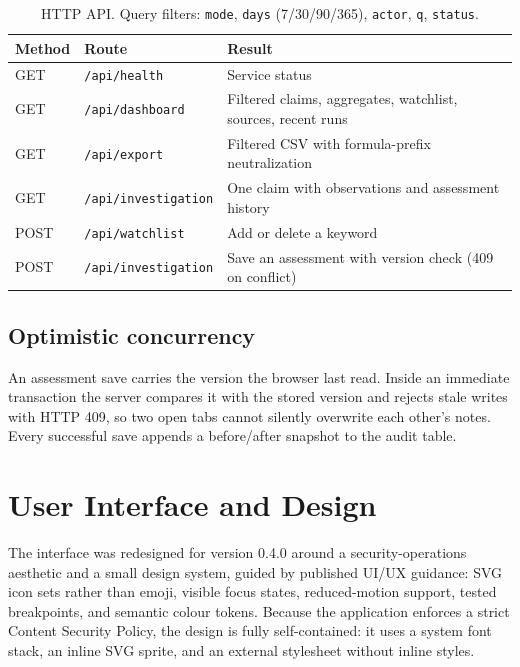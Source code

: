 \documentclass[11pt,a4paper]{article}
\newcommand{\code}[1]{\texttt{\small #1}}
\begin{document}
\begin{table}[H]
\centering
\renewcommand{\arraystretch}{1.2}
\begin{tabularx}{\linewidth}{@{}l l X@{}}
\toprule
\textbf{Method} & \textbf{Route} & \textbf{Result} \\
\midrule
GET & \code{/api/health} & Service status \\
GET & \code{/api/dashboard} & Filtered claims, aggregates, watchlist, sources, recent runs \\
GET & \code{/api/export} & Filtered CSV with formula-prefix neutralization \\
GET & \code{/api/investigation} & One claim with observations and assessment history \\
POST & \code{/api/watchlist} & Add or delete a keyword \\
POST & \code{/api/investigation} & Save an assessment with version check (409 on conflict) \\
\bottomrule
\end{tabularx}
\caption{HTTP API. Query filters: \code{mode}, \code{days} (7/30/90/365), \code{actor}, \code{q}, \code{status}.}
\end{table}

\subsection{Optimistic concurrency}
An assessment save carries the version the browser last read. Inside an immediate transaction the server compares it with the stored version and rejects stale writes with HTTP 409, so two open tabs cannot silently overwrite each other's notes. Every successful save appends a before/after snapshot to the audit table.

\section{User Interface and Design}
The interface was redesigned for version 0.4.0 around a security-operations aesthetic and a small design system, guided by published UI/UX guidance: SVG icon sets rather than emoji, visible focus states, reduced-motion support, tested breakpoints, and semantic colour tokens. Because the application enforces a strict Content Security Policy, the design is fully self-contained: it uses a system font stack, an inline SVG sprite, and an external stylesheet without inline styles.
\end{document}
